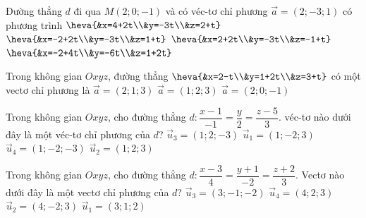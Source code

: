 \begin{ex}%
	Đường thẳng $d$ đi qua  $M(2; 0;-1)$ và có véc-tơ chỉ phương $\overrightarrow{a}=(2;-3; 1)$ có phương trình
	 \choice
		{$\heva{&x=4+2t\\&y=-3t\\&z=2+t}$} 
		 {$\heva{&x=-2+2t\\&y=-3t\\&z=1+t}$}
		{\True  $\heva{&x=2+2t\\&y=-3t\\&z=-1+t}$}
		 {$\heva{&x=-2+4t\\&y=-6t\\&z=1+2t}$}
\end{ex}

\begin{ex}%
	Trong không gian $Oxyz$, đường thẳng $\heva{&x=2-t\\&y=1+2t\\&z=3+t}$ có một  vectơ chỉ phương là
		{$\overrightarrow{a}=(2;1;3)$} 
		 {$\overrightarrow{a}=(1;2;3)$}
		{$\overrightarrow{a}=(2;0;-1)$} 
\end{ex}

\begin{ex}%
	Trong không gian $Oxyz$, cho đường thẳng $d\colon \dfrac{x-1}{-1}=\dfrac{y}{2}=\dfrac{z-5}{3}$. véc-tơ nào dưới đây là một véc-tơ  chỉ phương của $d$?
	 \choice
		{$\overrightarrow{u}_3=(1;2;-3)$} 
		 {$\overrightarrow{u}_1=(1;-2;3)$}
		{\True  $\overrightarrow{u}_4=(1;-2;-3)$}
		 {$\overrightarrow{u}_2=(1;2;3)$}
\end{ex}

\begin{ex}%
	Trong không gian $Oxyz$, cho đường thẳng $d  \colon \dfrac{x-3}{4} = \dfrac{y+1}{-2} = \dfrac{z+2}{3}$. Vectơ nào dưới đây là một vectơ chỉ phương của $d$?
	 \choice
		{$\overrightarrow{u}_3 =  (3;-1;-2)$}
		{$\overrightarrow{u}_4 =  (4;2;3)$}
		{\True $\overrightarrow{u}_2 = (4;-2;3)$} 
		{$\overrightarrow{u}_1 =  (3;1;2)$}
\end{ex}

